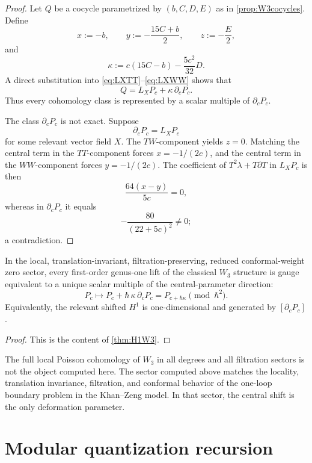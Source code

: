 \begin{proof}
Let $Q$ be a cocycle parametrized by $(b,C,D,E)$ as in \cref{prop:W3cocycles}.
Define
\[
x:=-b,\qquad
y:=-\frac{15C+b}{2},\qquad
z:=-\frac E2,
\]
and
\[
\kappa:=c(15C-b)-\frac{5c^2}{32}D.
\]
A direct substitution into \eqref{eq:LXTT}--\eqref{eq:LXWW} shows that
\[
Q=L_XP_c+\kappa\,\partial_cP_c.
\]
Thus every cohomology class is represented by a scalar multiple of $\partial_cP_c$.

The class $\partial_cP_c$ is not exact. Suppose
\[
\partial_cP_c=L_XP_c
\]
for some relevant vector field $X$. The $TW$-component yields $z=0$.
Matching the central term in the $TT$-component forces $x=-1/(2c)$,
and the central term in the $WW$-component forces $y=-1/(2c)$. The
coefficient of $T^2\lambda+T\partial T$ in $L_XP_c$ is then
\[
\frac{64(x-y)}{5c}=0,
\]
whereas in $\partial_cP_c$ it equals
\[
-\frac{80}{(22+5c)^2}\neq 0;
\]
a contradiction.
\end{proof}

\begin{corollary}\label{cor:unique-lift}
In the local, translation-invariant, filtration-preserving, reduced conformal-weight zero
sector, every first-order genus-one lift of the classical $W_3$ structure is gauge equivalent
to a unique scalar multiple of the central-parameter direction:
\[
P_c\longmapsto P_c+\hbar\,\kappa\,\partial_cP_c
=
P_{c+\hbar\kappa}\pmod{\hbar^2}.
\]
Equivalently, the relevant shifted $H^1$ is one-dimensional and generated by
$[\partial_cP_c]$.
\end{corollary}

\begin{proof}
This is the content of \cref{thm:H1W3}.
\end{proof}

\begin{remark}
The full local Poisson cohomology of $W_3$ in all degrees and all
filtration sectors is not the object computed here. The sector computed
above matches the locality, translation invariance, filtration, and
conformal behavior of the one-loop boundary problem in the Khan--Zeng
model. In that sector, the central shift is the only deformation
parameter.
\end{remark}

\section{Modular quantization recursion}

